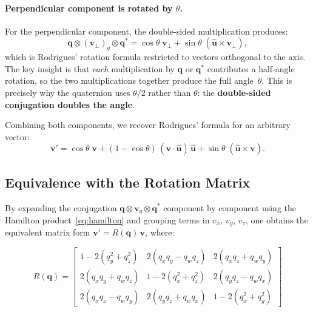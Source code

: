 \paragraph{Perpendicular component is rotated by $\theta$.}
For the perpendicular component, the double-sided multiplication produces:
\begin{equation}
  \mathbf{q}\otimes(\mathbf{v}_\perp)_q\otimes\mathbf{q}^*
  = \cos\theta\;\mathbf{v}_\perp
  + \sin\theta\;(\hat{\mathbf{u}}\times\mathbf{v}_\perp),
  \label{eq:perp_rotation}
\end{equation}
which is Rodrigues' rotation formula restricted to vectors orthogonal
to the axis.  The key insight is that \emph{each} multiplication by
$\mathbf{q}$ or $\mathbf{q}^*$ contributes a half-angle rotation, so the
two multiplications together produce the full angle~$\theta$.  This is
precisely why the quaternion uses $\theta/2$ rather than $\theta$: the
\textbf{double-sided conjugation doubles the angle}.

Combining both components, we recover Rodrigues' formula for an arbitrary
vector:
\begin{equation}
  \mathbf{v}' = \cos\theta\;\mathbf{v}
              + (1-\cos\theta)\,(\mathbf{v}\cdot\hat{\mathbf{u}})\,\hat{\mathbf{u}}
              + \sin\theta\;(\hat{\mathbf{u}}\times\mathbf{v}).
  \label{eq:rodrigues}
\end{equation}

\subsection{Equivalence with the Rotation Matrix}
\label{sec:quat:matrix}

By expanding the conjugation
$\mathbf{q}\otimes\mathbf{v}_q\otimes\mathbf{q}^*$ component by component
using the Hamilton product~\eqref{eq:hamilton} and grouping terms in
$v_x$, $v_y$, $v_z$, one obtains the equivalent matrix form
$\mathbf{v}' = R(\mathbf{q})\,\mathbf{v}$, where:

\begin{equation}
  R(\mathbf{q}) = \begin{bmatrix}
    1 - 2(q_y^2+q_z^2)  & 2(q_x q_y - q_w q_z)  & 2(q_x q_z + q_w q_y) \\[4pt]
    2(q_x q_y + q_w q_z) & 1 - 2(q_x^2+q_z^2)    & 2(q_y q_z - q_w q_x) \\[4pt]
    2(q_x q_z - q_w q_y) & 2(q_y q_z + q_w q_x)   & 1 - 2(q_x^2+q_y^2)
  \end{bmatrix}
  \label{eq:rotation_matrix}
\end{equation}

